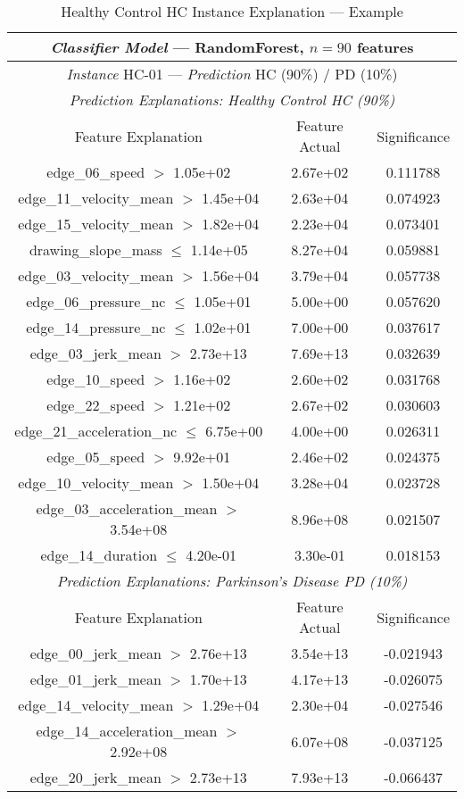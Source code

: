 \begin{table}
\centering
\begin{tabular}{ccc}
\toprule
\multicolumn{3}{c}{\textit{Classifier Model} --- RandomForest, $n=90$ features}\\
\midrule
\multicolumn{3}{c}{\textit{Instance} HC-01 --- \textit{Prediction} HC (90\%) / PD (10\%)}\\
\midrule
\multicolumn{3}{c}{\textit{Prediction Explanations: Healthy Control HC (90\%)}}\\
Feature Explanation & Feature Actual & Significance \\
\toprule
 edge\_06\_speed $>$ 1.05e+02 &  2.67e+02 &  0.111788 \\
 edge\_11\_velocity\_mean $>$ 1.45e+04 &  2.63e+04 &  0.074923 \\
 edge\_15\_velocity\_mean $>$ 1.82e+04 &  2.23e+04 &  0.073401 \\
 drawing\_slope\_mass $\leq$ 1.14e+05 &  8.27e+04 &  0.059881 \\
 edge\_03\_velocity\_mean $>$ 1.56e+04 &  3.79e+04 &  0.057738 \\
 edge\_06\_pressure\_nc $\leq$ 1.05e+01 &  5.00e+00 &  0.057620 \\
 edge\_14\_pressure\_nc $\leq$ 1.02e+01 &  7.00e+00 &  0.037617 \\
 edge\_03\_jerk\_mean $>$ 2.73e+13 &  7.69e+13 &  0.032639 \\
 edge\_10\_speed $>$ 1.16e+02 &  2.60e+02 &  0.031768 \\
 edge\_22\_speed $>$ 1.21e+02 &  2.67e+02 &  0.030603 \\
 edge\_21\_acceleration\_nc $\leq$ 6.75e+00 &  4.00e+00 &  0.026311 \\
 edge\_05\_speed $>$ 9.92e+01 &  2.46e+02 &  0.024375 \\
 edge\_10\_velocity\_mean $>$ 1.50e+04 &  3.28e+04 &  0.023728 \\
 edge\_03\_acceleration\_mean $>$ 3.54e+08 &  8.96e+08 &  0.021507 \\
 edge\_14\_duration $\leq$ 4.20e-01 &  3.30e-01 &  0.018153 \\
 \midrule
\multicolumn{3}{c}{\textit{Prediction Explanations: Parkinson's Disease PD (10\%)}}\\
Feature Explanation & Feature Actual & Significance \\
\toprule
 edge\_00\_jerk\_mean $>$ 2.76e+13 &  3.54e+13 & -0.021943 \\
 edge\_01\_jerk\_mean $>$ 1.70e+13 &  4.17e+13 & -0.026075 \\
 edge\_14\_velocity\_mean $>$ 1.29e+04 &  2.30e+04 & -0.027546 \\
 edge\_14\_acceleration\_mean $>$ 2.92e+08 &  6.07e+08 & -0.037125 \\
 edge\_20\_jerk\_mean $>$ 2.73e+13 &  7.93e+13 & -0.066437 \\
\bottomrule
\end{tabular}
\caption{Healthy Control HC Instance Explanation --- Example}
\label{explanation2}
\end{table}